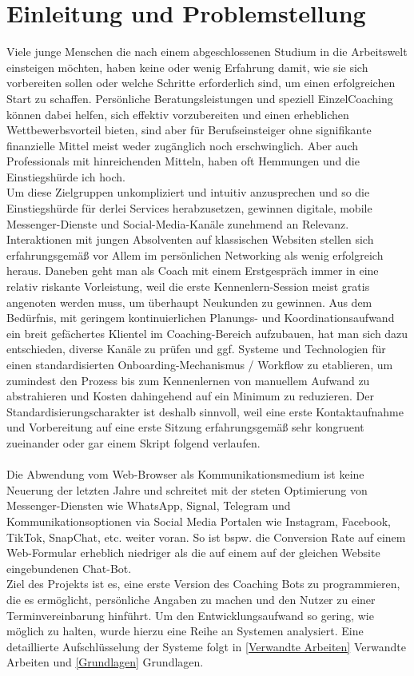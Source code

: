 \chapter{Einleitung und Problemstellung} \label{Einleitung und Problemstellung}
        
    Viele junge Menschen die nach einem abgeschlossenen Studium in die Arbeitswelt einsteigen möchten, haben keine oder wenig Erfahrung damit, wie sie sich vorbereiten sollen oder welche Schritte erforderlich sind, um einen erfolgreichen Start zu schaffen. Persönliche Beratungsleistungen und speziell Einzel\-Coaching können dabei helfen, sich effektiv vorzubereiten und einen erheblichen Wettbewerbsvorteil bieten, sind aber für Berufseinsteiger ohne signifikante finanzielle Mittel meist weder zugänglich noch erschwinglich. Aber auch Professionals mit hinreichenden Mitteln, haben oft Hemmungen und die Einstiegshürde ich hoch.\\
    
    Um diese Zielgruppen unkompliziert und intuitiv anzusprechen und so die Einstiegshürde für derlei Services herabzusetzen, gewinnen digitale, mobile Messenger-Dienste und Social-Media-Kanäle zunehmend an Relevanz. Interaktionen mit jungen Absolventen auf klassischen Websiten stellen sich erfahrungsgemäß vor Allem im persönlichen Networking als wenig erfolgreich heraus. Daneben geht man als Coach mit einem Erstgespräch immer in eine relativ riskante Vorleistung, weil die erste Kennenlern-Session meist gratis angenoten werden muss, um überhaupt Neukunden zu gewinnen. 
    Aus dem Bedürfnis, mit geringem kontinuierlichen Planungs- und Koordinationsaufwand ein breit gefächertes Klientel im Coaching-Bereich aufzubauen, hat man sich dazu entschieden, diverse Kanäle zu prüfen und ggf. Systeme und Technologien für einen standardisierten Onboarding-Mechanismus / Workflow zu etablieren, um zumindest den Prozess bis zum Kennenlernen von manuellem Aufwand zu abstrahieren und Kosten dahingehend auf ein Minimum zu reduzieren. Der Standardisierungscharakter ist deshalb sinnvoll, weil eine erste Kontaktaufnahme und Vorbereitung auf eine erste Sitzung erfahrungsgemäß sehr kongruent zueinander oder gar einem Skript folgend verlaufen. \\
    \\
    Die Abwendung vom Web-Browser als Kommunikationsmedium ist keine Neuerung der letzten Jahre und schreitet mit der steten Optimierung von Messenger-Diensten wie WhatsApp, Signal, Telegram und Kommunikationsoptionen via Social Media Portalen wie Instagram, Facebook, TikTok, SnapChat, etc. weiter voran. So ist bspw. die Conversion Rate auf einem Web-Formular erheblich niedriger als die auf einem auf der gleichen Website eingebundenen Chat-Bot. 
    \\
    Ziel des Projekts ist es, eine erste Version des Coaching Bots zu programmieren, die es ermöglicht, persönliche Angaben zu machen und den Nutzer zu einer Terminvereinbarung hinführt. Um den Entwicklungsaufwand so gering, wie möglich zu halten, wurde hierzu eine Reihe an Systemen analysiert. Eine detaillierte Aufschlüsselung der Systeme folgt in \ref{Verwandte Arbeiten} Verwandte Arbeiten und \ref{Grundlagen} Grundlagen.

